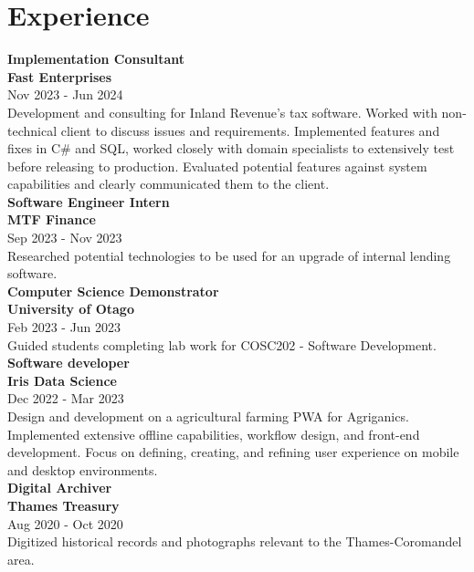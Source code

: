 \documentclass[lighthipster]{simplehipstercv}
\begin{document}
    \begin{minipage}[t]{1\textwidth}
    \section*{Experience}
    
    \textbf{Implementation Consultant}\\
    \textbf{Fast Enterprises }\\
    Nov 2023 - Jun 2024 \\
    Development and consulting for Inland Revenue's tax software. 
        Worked with non-technical client to discuss issues and requirements. 
        Implemented features and fixes in C\# and SQL, worked closely with domain specialists to extensively test before releasing to production.
        Evaluated potential features against system capabilities and clearly communicated them to the client. \\
    
    \textbf{Software Engineer Intern}\\
    \textbf{MTF Finance }\\
    Sep 2023 - Nov 2023 \\
    Researched potential technologies to be used for an upgrade of internal lending software.\\
    
    \textbf{Computer Science Demonstrator}\\
    \textbf{University of Otago }\\
    Feb 2023 - Jun 2023 \\
    Guided students completing lab work for COSC202 - Software Development.\\
    
    \textbf{Software developer}\\
    \textbf{Iris Data Science }\\
    Dec 2022 - Mar 2023 \\
    Design and development on a agricultural farming PWA for Agriganics. 
        Implemented extensive offline capabilities, workflow design, and front-end development. 
        Focus on defining, creating, and refining user experience on mobile and desktop environments.\\
    
    \textbf{Digital Archiver}\\
    \textbf{Thames Treasury }\\
    Aug 2020 - Oct 2020 \\
    Digitized historical records and photographs relevant to the Thames-Coromandel area.\\
    

\end{minipage}
\end{document}
